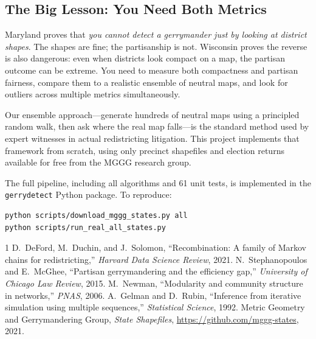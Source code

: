 \documentclass[11pt]{article}
\begin{document}
\subsection*{The Big Lesson: You Need Both Metrics}

Maryland proves that \emph{you cannot detect a gerrymander just by
looking at district shapes}. The shapes are fine; the partisanship is
not. Wisconsin proves the reverse is also dangerous: even when districts
look compact on a map, the partisan outcome can be extreme. You need to
measure both compactness and partisan fairness, compare them to a
realistic ensemble of neutral maps, and look for outliers across multiple
metrics simultaneously.

Our ensemble approach---generate hundreds of neutral maps using a
principled random walk, then ask where the real map falls---is the
standard method used by expert witnesses in actual redistricting
litigation. This project implements that framework from scratch, using
only precinct shapefiles and election returns available for free from
the MGGG research group.

The full pipeline, including all algorithms and 61 unit tests, is
implemented in the \texttt{gerrydetect} Python package. To reproduce:
\begin{verbatim}
python scripts/download_mggg_states.py all
python scripts/run_real_all_states.py
\end{verbatim}

\begin{thebibliography}{1}
 D.~DeFord, M.~Duchin, and J.~Solomon,
  ``Recombination: A family of Markov chains for redistricting,''
  \textit{Harvard Data Science Review}, 2021.
 N.~Stephanopoulos and E.~McGhee,
  ``Partisan gerrymandering and the efficiency gap,''
  \textit{University of Chicago Law Review}, 2015.
 M.~Newman, ``Modularity and community structure
  in networks,'' \textit{PNAS}, 2006.
 A.~Gelman and D.~Rubin, ``Inference from
  iterative simulation using multiple sequences,''
  \textit{Statistical Science}, 1992.
 Metric Geometry and Gerrymandering Group,
  \textit{State Shapefiles}, \url{https://github.com/mggg-states}, 2021.
\end{thebibliography}
\end{document}
